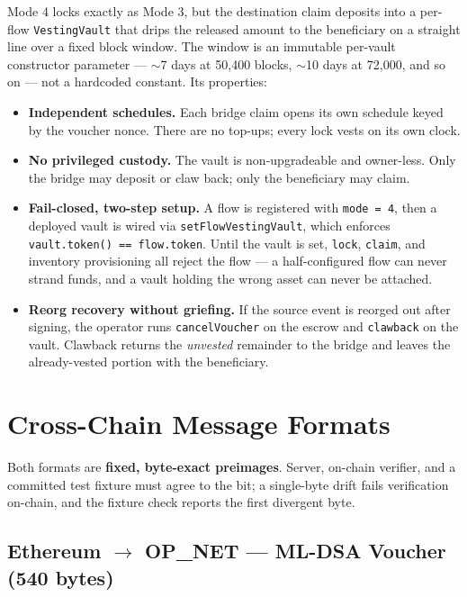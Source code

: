 \documentclass[11pt,a4paper]{article}
\begin{document}
Mode 4 locks exactly as Mode 3, but the destination claim deposits into a per-flow \texttt{VestingVault} that drips the released amount to the beneficiary on a straight line over a fixed block window. The window is an immutable per-vault constructor parameter --- $\sim$7 days at 50{,}400 blocks, $\sim$10 days at 72{,}000, and so on --- not a hardcoded constant. Its properties:

\begin{itemize}
  \item \textbf{Independent schedules.} Each bridge claim opens its own schedule keyed by the voucher nonce. There are no top-ups; every lock vests on its own clock.
  \item \textbf{No privileged custody.} The vault is non-upgradeable and owner-less. Only the bridge may deposit or claw back; only the beneficiary may claim.
  \item \textbf{Fail-closed, two-step setup.} A flow is registered with \texttt{mode = 4}, then a deployed vault is wired via \texttt{setFlowVestingVault}, which enforces \texttt{vault.token() == flow.token}. Until the vault is set, \texttt{lock}, \texttt{claim}, and inventory provisioning all reject the flow --- a half-configured flow can never strand funds, and a vault holding the wrong asset can never be attached.
  \item \textbf{Reorg recovery without griefing.} If the source event is reorged out after signing, the operator runs \texttt{cancelVoucher} on the escrow and \texttt{clawback} on the vault. Clawback returns the \emph{unvested} remainder to the bridge and leaves the already-vested portion with the beneficiary.
\end{itemize}

\section{Cross-Chain Message Formats}\label{sec:formats}

Both formats are \textbf{fixed, byte-exact preimages}. Server, on-chain verifier, and a committed test fixture must agree to the bit; a single-byte drift fails verification on-chain, and the fixture check reports the first divergent byte.

\subsection{Ethereum $\rightarrow$ OP\_NET --- ML-DSA Voucher (540 bytes)}
\end{document}
